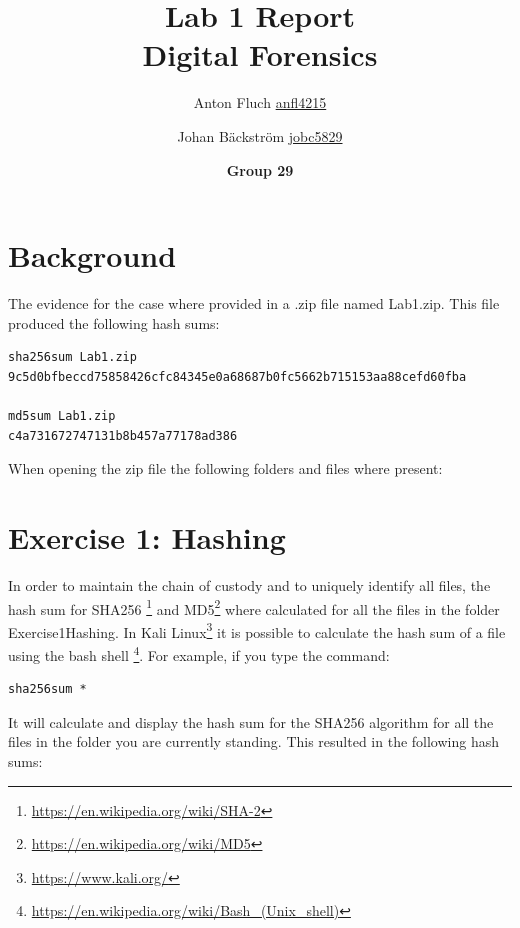 \documentclass[a4paper,10pt,oneside]{article}
\title{Lab 1 Report \\ Digital Forensics}
\author{Anton Fluch \url{anfl4215} \and Johan Bäckström \url{jobc5829} \and{\textbf{Group 29}}}
\begin{document}
\maketitle
\newpage

\tableofcontents
\newpage

\section{Background}
The evidence for the case where provided in a .zip file named Lab1.zip. This file produced the following hash sums:


\begin{lstlisting}[caption=SHA256 and MD5 sum for Lab1.zip]
sha256sum Lab1.zip
9c5d0bfbeccd75858426cfc84345e0a68687b0fc5662b715153aa88cefd60fba

md5sum Lab1.zip
c4a731672747131b8b457a77178ad386
\end{lstlisting}
When opening the zip file the following folders and files where present:

\newpage

\section{Exercise 1: Hashing}
In order to maintain the chain of custody and to uniquely identify all files, the hash sum for SHA256
\footnote{\url{https://en.wikipedia.org/wiki/SHA-2}} and MD5\footnote{\url{https://en.wikipedia.org/wiki/MD5}}
where calculated for all the files in the folder Exercise1\textunderscore Hashing. In Kali Linux\footnote{\url{https://www.kali.org/}}
it is possible to calculate the hash sum of a file using the bash shell \footnote{\url{https://en.wikipedia.org/wiki/Bash_(Unix_shell)}}.
For example, if you type the command:
\begin{lstlisting}[caption= calculate sha256 sum of all files in folder]
sha256sum *
\end{lstlisting}
It will calculate and display the hash sum for the SHA256 algorithm for all the files in the folder you are currently standing.
This resulted in the following hash sums:
\end{document}
